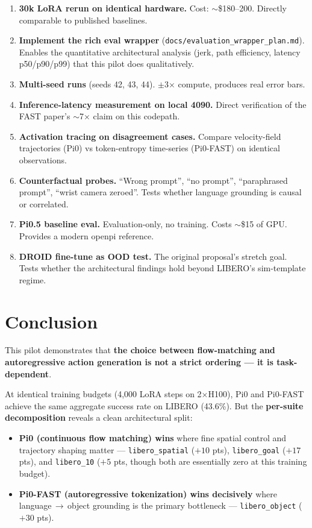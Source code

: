 \documentclass[11pt,letterpaper]{article}
\begin{document}
\begin{enumerate}[noitemsep,topsep=2pt]
  \item \textbf{30k LoRA rerun on identical hardware.} Cost: $\sim$\$180--200. Directly comparable to published baselines.
  \item \textbf{Implement the rich eval wrapper} (\texttt{docs/evaluation\_wrapper\_plan.md}). Enables the quantitative architectural analysis (jerk, path efficiency, latency p50/p90/p99) that this pilot does qualitatively.
  \item \textbf{Multi-seed runs} (seeds 42, 43, 44). $\pm$3$\times$ compute, produces real error bars.
  \item \textbf{Inference-latency measurement on local 4090.} Direct verification of the FAST paper's $\sim$7$\times$ claim on this codepath.
  \item \textbf{Activation tracing on disagreement cases.} Compare velocity-field trajectories (Pi0) vs token-entropy time-series (Pi0-FAST) on identical observations.
  \item \textbf{Counterfactual probes.} ``Wrong prompt'', ``no prompt'', ``paraphrased prompt'', ``wrist camera zeroed''. Tests whether language grounding is causal or correlated.
  \item \textbf{Pi0.5 baseline eval.} Evaluation-only, no training. Costs $\sim$\$15 of GPU. Provides a modern openpi reference.
  \item \textbf{DROID fine-tune as OOD test.} The original proposal's stretch goal. Tests whether the architectural findings hold beyond LIBERO's sim-template regime.
\end{enumerate}

\section{Conclusion}

This pilot demonstrates that \textbf{the choice between flow-matching and autoregressive action generation is not a strict ordering --- it is task-dependent}.

At identical training budgets (4{,}000 LoRA steps on 2$\times$H100), Pi0 and Pi0-FAST achieve the same aggregate success rate on LIBERO (43.6\%). But the \textbf{per-suite decomposition} reveals a clean architectural split:

\begin{itemize}[noitemsep,topsep=2pt]
  \item \textbf{Pi0 (continuous flow matching) wins} where fine spatial control and trajectory shaping matter --- \texttt{libero\_spatial} ($+10$ pts), \texttt{libero\_goal} ($+17$ pts), and \texttt{libero\_10} ($+5$ pts, though both are essentially zero at this training budget).
  \item \textbf{Pi0-FAST (autoregressive tokenization) wins decisively} where language\,$\to$\,object grounding is the primary bottleneck --- \texttt{libero\_object} ($+30$ pts).
\end{itemize}
\end{document}
